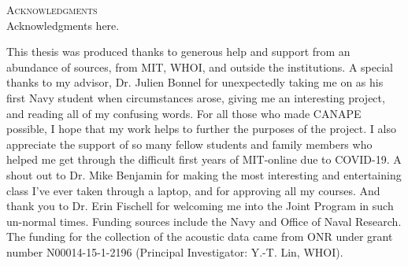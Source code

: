 
\noindent
\begin{singlespace}
{\parindent0pt
	{\large \textsc{Acknowledgments}} \\

	Acknowledgments here.

	This thesis was produced thanks to generous help and support from an abundance of sources, from MIT, WHOI, and outside the institutions. A special thanks to my advisor, Dr. Julien Bonnel for unexpectedly taking me on as his first Navy student when circumstances arose, giving me an interesting project, and reading all of my confusing words. For all those who made CANAPE possible, I hope that my work helps to further the purposes of the project. I also appreciate the support of so many fellow students and family members who helped me get through the difficult first years of MIT-online due to COVID-19. A shout out to Dr. Mike Benjamin for making the most interesting and entertaining class I've ever taken through a laptop, and for approving all my courses. And thank you to Dr. Erin Fischell for welcoming me into the Joint Program in such un-normal times. Funding sources include the Navy and Office of Naval Research. The funding for the collection of the acoustic data came from ONR under grant number N00014-15-1-2196 (Principal Investigator: Y.-T. Lin, WHOI).
}

\end{singlespace}

\newpage
\null
\thispagestyle{empty}
\newpage